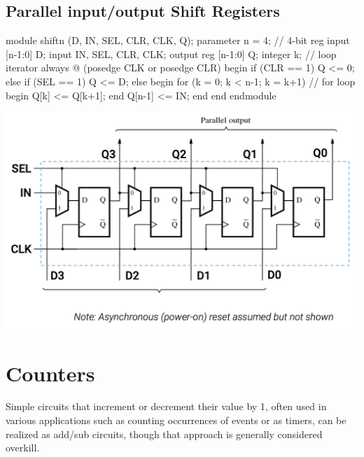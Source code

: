 \documentclass[12pt,openany]{book}
\begin{document}
\subsection{Parallel input/output Shift Registers}
\begin{minipage}{0.4\textwidth}
\begin{vhdl}
module shiftn (D, IN, SEL, CLR, CLK, Q);
	parameter n = 4; // 4-bit reg
	input [n-1:0] D;
	input IN, SEL, CLR, CLK;
	output reg [n-1:0] Q;
	integer k; // loop iterator
	always @ (posedge CLK or posedge CLR) begin
		if (CLR == 1) Q <= 0;
		else if (SEL == 1) Q <= D;
		else begin
			for (k = 0; k < n-1; k = k+1) // for loop
			begin
				Q[k] <= Q[k+1];
			end
			Q[n-1] <= IN;
		end
	end
endmodule
\end{vhdl}
\end{minipage}
\hfill
\hspace*{-2em}
\vline
\hfill
\hspace*{-4em}
\begin{minipage}{0.4\textwidth}
\includegraphics[width=1.3\textwidth]{circuits/14.3.2.png}
\end{minipage}

\newpage 
\section{Counters}
\vspace*{-5px}
Simple circuits that increment or decrement their value by 1, often used in various applications such as counting occurrences of events or as timers, can be realized as add/sub circuits, though that approach is generally considered overkill.
\newline
\end{document}
